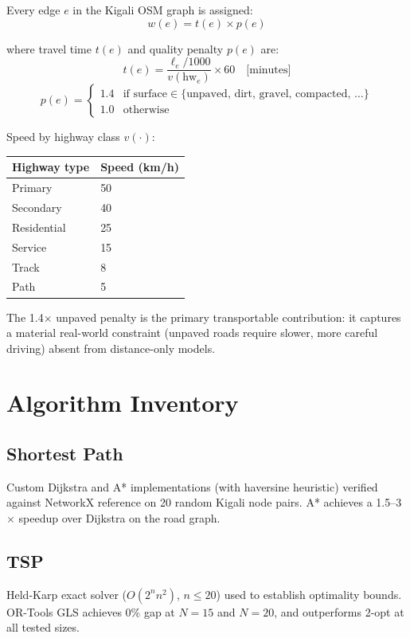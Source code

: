 \documentclass[12pt, a4paper]{article}
\begin{document}
Every edge $e$ in the Kigali OSM graph is assigned:
\[
  w(e) = t(e) \times p(e)
\]

\noindent where travel time $t(e)$ and quality penalty $p(e)$ are:
\[
  t(e) = \frac{\ell_e / 1000}{v(\text{hw}_e)} \times 60 \quad \text{[minutes]}
\]
\[
  p(e) = \begin{cases} 1.4 & \text{if surface} \in \{\text{unpaved, dirt, gravel, compacted, \ldots}\} \\ 1.0 & \text{otherwise} \end{cases}
\]

Speed by highway class $v(\cdot)$:

\begin{center}
\begin{tabular}{ll}
\toprule
Highway type & Speed (km/h) \\
\midrule
Primary      & 50 \\
Secondary    & 40 \\
Residential  & 25 \\
Service      & 15 \\
Track        & 8  \\
Path         & 5  \\
\bottomrule
\end{tabular}
\end{center}

The 1.4$\times$ unpaved penalty is the primary transportable contribution:
it captures a material real-world constraint (unpaved roads require slower,
more careful driving) absent from distance-only models.

\section{Algorithm Inventory}
\label{sec:algorithms}

\subsection{Shortest Path}
Custom Dijkstra and A* implementations (with haversine heuristic) verified
against NetworkX reference on 20 random Kigali node pairs. A* achieves a
1.5--3$\times$ speedup over Dijkstra on the road graph.

\subsection{TSP}
Held-Karp exact solver ($O(2^n n^2)$, $n \leq 20$) used to establish
optimality bounds. OR-Tools GLS achieves 0\% gap at $N=15$ and $N=20$,
and outperforms 2-opt at all tested sizes.
\end{document}
